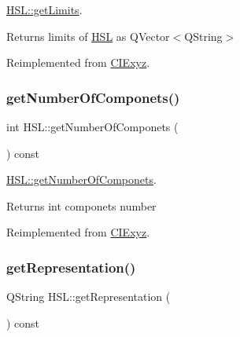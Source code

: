 \hyperlink{class_h_s_l_a7ac26d7b7b5755769165455e1b6d3312}{H\+S\+L\+::get\+Limits}. 

\begin{DoxyReturn}{Returns}
limits of \hyperlink{class_h_s_l}{H\+SL} as Q\+Vector$<$\+Q\+String$>$ 
\end{DoxyReturn}


Reimplemented from \hyperlink{class_c_i_exyz_a4c3aa6777f7720ae26b53174322a83f8}{C\+I\+Exyz}.

\mbox{\label{class_h_s_l_a6e582f5779c1b5f84abe8bb182a868d0}} 
\subsubsection{\texorpdfstring{get\+Number\+Of\+Componets()}{getNumberOfComponets()}}
{\footnotesize\ttfamily int H\+S\+L\+::get\+Number\+Of\+Componets (\begin{DoxyParamCaption}{ }\end{DoxyParamCaption}) const\hspace{0.3cm}{\ttfamily [virtual]}}



\hyperlink{class_h_s_l_a6e582f5779c1b5f84abe8bb182a868d0}{H\+S\+L\+::get\+Number\+Of\+Componets}. 

\begin{DoxyReturn}{Returns}
int componets number 
\end{DoxyReturn}


Reimplemented from \hyperlink{class_c_i_exyz_af168733bb1bca36a7ae5d75c67de046e}{C\+I\+Exyz}.

\mbox{\label{class_h_s_l_a774dc0a5dad87bc9ff44956af4873602}} 
\subsubsection{\texorpdfstring{get\+Representation()}{getRepresentation()}}
{\footnotesize\ttfamily Q\+String H\+S\+L\+::get\+Representation (\begin{DoxyParamCaption}{ }\end{DoxyParamCaption}) const\hspace{0.3cm}{\ttfamily [virtual]}}



